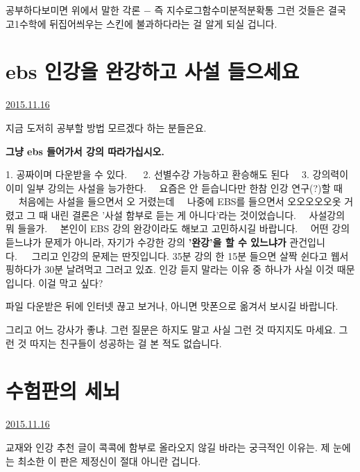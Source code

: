 공부하다보미면 위에서 말한 각론 $-$ 즉 지수로그함수미분적분확통 그런 것들은
결국 고1수학에 뒤집어씌우는 스킨에 불과하다라는 걸 알게 되실 겁니다.
\vspace{5mm}






\section{ebs 인강을 완강하고 사설 들으세요}
\href{https://www.kockoc.com/Apoc/491239}{2015.11.16}

\vspace{5mm}

지금 도저히 공부할 방법 모르겠다 하는 분들은요.
\vspace{5mm}

\textbf{그냥 ebs 들어가서 강의 따라가십시오.}
\item 1. 공짜이며 다운받을 수 있다.    2. 선별수강 가능하고 환승해도 된다   3. 강의력이 이미 일부 강의는 사설을 능가한다.   요즘은 안 듣습니다만 한참 인강 연구(?)할 때    처음에는 사설을 들으면서 오 거렸는데   나중에 EBS를 들으면서 오오오오오옷 거렸고 그 때 내린 결론은 '사설 함부로 듣는 게 아니다'라는 것이었습니다.   사설강의 뭐 들을가.   본인이 EBS 강의 완강이라도 해보고 고민하시길 바랍니다.   어떤 강의 듣느냐가 문제가 아니라, 자기가 수강한 강의 \textbf{'완강'을 할 수 있느냐가} 관건입니다.   그리고 인강의 문제는 딴짓입니다. 35분 강의 한 15분 들으면 살짝 쉰다고 웹서핑하다가 30분 날려먹고 그러고 있죠.
인강 듣지 말라는 이유 중 하나가 사실 이것 때문입니다.
이걸 막고 싶다?
\vspace{5mm}

파일 다운받은 뒤에 인터넷 끊고 보거나, 아니면 맛폰으로 옮겨서 보시길 바랍니다.
\vspace{5mm}

그리고 어느 강사가 좋냐.
그런 질문은 하지도 말고 사실 그런 것 따지지도 마세요.
그런 것 따지는 친구들이 성공하는 걸 본 적도 없습니다.
\vspace{5mm}






\section{수험판의 세뇌}
\href{https://www.kockoc.com/Apoc/491558}{2015.11.16}

\vspace{5mm}

교재와 인강 추천 글이 콕콕에 함부로 올라오지 않길 바라는 궁극적인 이유는.
제 눈에는 최소한 이 판은 제정신이 절대 아니란 겁니다.
\vspace{5mm}

